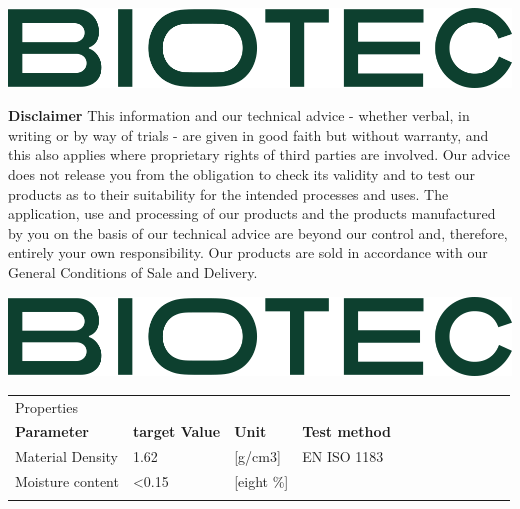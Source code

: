 \documentclass{article}
\begin{document}
\includegraphics[scale=0.30]{biotec}

\small{
	\textbf{Disclaimer} This information and our technical advice - whether verbal, in writing or by way of trials - are given in good faith but without warranty, and this also applies
	where proprietary rights of third parties are involved. Our advice does not release you from the obligation to check its validity and to test our products as to their
	suitability for the intended processes and uses. The application, use and processing of our products and the products manufactured by you on the basis of our technical
	advice are beyond our control and, therefore, entirely your own responsibility. Our products are sold in accordance with our General Conditions of Sale and Delivery.
}
\newpage

\includegraphics[scale=0.20]{biotec}

\begin{center}
	\footnotesize{
		\begin{tabularx}{\textwidth}{ X l X l X l X l X l X l }
			\rowcolor{LightCyan} Properties &                       &               &                      &   & \\
			\textbf{Parameter}              & \textbf{target Value} & \textbf{Unit} & \textbf{Test method}       \\
			\arrayrulecolor{line_color}\hline
			Material Density                & 1.62                  & [g/cm3]       & EN ISO 1183          &   & \\
			\arrayrulecolor{line_color}\hline
			Moisture content                & <0.15                 & [eight \%]    &                      &     \\
			\arrayrulecolor{line_color}\hline
		\end{tabularx}
	}
\end{center}
\end{document}
